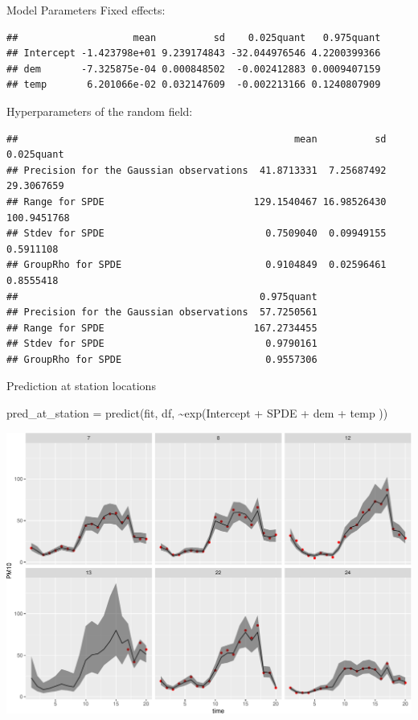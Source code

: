 \documentclass[
  ignorenonframetext,
]{beamer}
\newenvironment{Shaded}{\begin{snugshade}}{\end{snugshade}}
\newcommand{\FunctionTok}[1]{\textcolor[rgb]{0.00,0.00,0.00}{#1}}
\newcommand{\NormalTok}[1]{#1}
\newcommand{\OtherTok}[1]{\textcolor[rgb]{0.56,0.35,0.01}{#1}}
\newcommand{\SpecialCharTok}[1]{\textcolor[rgb]{0.00,0.00,0.00}{#1}}
\begin{document}
\begin{frame}[fragile]{Model Parameters}
\protect\hypertarget{model-parameters}{}
Fixed effects: \tiny

\begin{verbatim}
##                    mean          sd    0.025quant   0.975quant
## Intercept -1.423798e+01 9.239174843 -32.044976546 4.2200399366
## dem       -7.325875e-04 0.000848502  -0.002412883 0.0009407159
## temp       6.201066e-02 0.032147609  -0.002213166 0.1240807909
\end{verbatim}

\normalsize

Hyperparameters of the random field: \tiny

\begin{verbatim}
##                                                mean          sd  0.025quant
## Precision for the Gaussian observations  41.8713331  7.25687492  29.3067659
## Range for SPDE                          129.1540467 16.98526430 100.9451768
## Stdev for SPDE                            0.7509040  0.09949155   0.5911108
## GroupRho for SPDE                         0.9104849  0.02596461   0.8555418
##                                          0.975quant
## Precision for the Gaussian observations  57.7250561
## Range for SPDE                          167.2734455
## Stdev for SPDE                            0.9790161
## GroupRho for SPDE                         0.9557306
\end{verbatim}
\end{frame}

\begin{frame}[fragile]{Prediction at station locations}
\protect\hypertarget{prediction-at-station-locations}{}
\small

\begin{Shaded}
\begin{Highlighting}[]
\NormalTok{pred\_at\_station }\OtherTok{=} \FunctionTok{predict}\NormalTok{(fit, df, }
                          \SpecialCharTok{\textasciitilde{}}\FunctionTok{exp}\NormalTok{(Intercept }\SpecialCharTok{+}\NormalTok{ SPDE }\SpecialCharTok{+}\NormalTok{ dem }\SpecialCharTok{+}\NormalTok{ temp ))}
\end{Highlighting}
\end{Shaded}

\normalsize

\begin{center}\includegraphics[width=0.7\linewidth]{Part3_Spatial_files/figure-beamer/unnamed-chunk-32-1} \end{center}
\end{frame}
\end{document}
